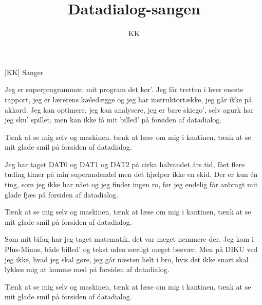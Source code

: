 \documentclass[a4paper,11pt]{article}
\title{Datadialog-sangen}
\author{KK}
\begin{document}
\maketitle

\begin{roles}
[KK] Sanger
\end{roles}

\begin{song}
Jeg er superprogrammør, mit program det kør'.
Jeg får tretten i hver eneste rapport,
jeg er lærerens kæledægge og jeg har instruktortække,
jeg går ikke på akkord.
Jeg kan optimere, jeg kan analysere,
jeg er bare skiego',
selv agurk har jeg sku' spillet, men kan ikke få mit billed'
på forsiden af datadialog.

Tænk at se mig selv og maskinen,
tænk at læse om mig i kantinen,
tænk at se mit glade smil
på forsiden af datadialog.

Jeg har taget DAT0 og DAT1 og DAT2
på cirka halvandet års tid,
fået flere tuding timer på min superandendel
men det hjælper ikke en skid.
Der er kun én ting, som jeg ikke har nået
og jeg finder ingen ro,
før jeg endelig får anbragt mit glade fjæs
på forsiden af datadialog.

Tænk at se mig selv og maskinen,
tænk at læse om mig i kantinen,
tænk at se mit glade smil
på forsiden af datadialog.

Som mit bifag har jeg taget matematik,
det var meget nemmere der.
Jeg kom i Plus-Minus, både billed' og tekst
uden særligt meget besvær.
Men på DIKU ved jeg ikke, hvad jeg skal gøre,
jeg går næsten helt i bro,
hvis det ikke snart skal lykkes mig at komme med
på forsiden af datadialog.

Tænk at se mig selv og maskinen,
tænk at læse om mig i kantinen,
tænk at se mit glade smil
på forsiden af datadialog.

\end{song}
\end{document}
